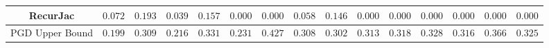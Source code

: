 \begin{table*}
{\begin{tabular}{c|c|c|c|c|c|c|c|c|c|c|c|c|c|c}
     RecurJac &       $0.072$ &       $0.193$ &       $0.039$ &       $0.157$ &       $0.000$ &       $0.000$ &       $0.058$ &       $0.146$ &       $0.000$ &       $0.000$ &       $0.000$ &       $0.000$ &       $0.000$ &       $0.000$ \\
\hline
PGD Upper Bound &       $0.199$ &       $0.309$ &       $0.216$ &       $0.331$ &       $0.231$ &       $0.427$ &       $0.308$ &       $0.302$ &       $0.313$ &       $0.318$ &       $0.328$ &       $0.316$ &       $0.366$ &       $0.325$ \\
\bottomrule

    \end{tabular}
    }
    \label{tab:exp-A-mnist-radius-robust-acc}
\end{table*}

